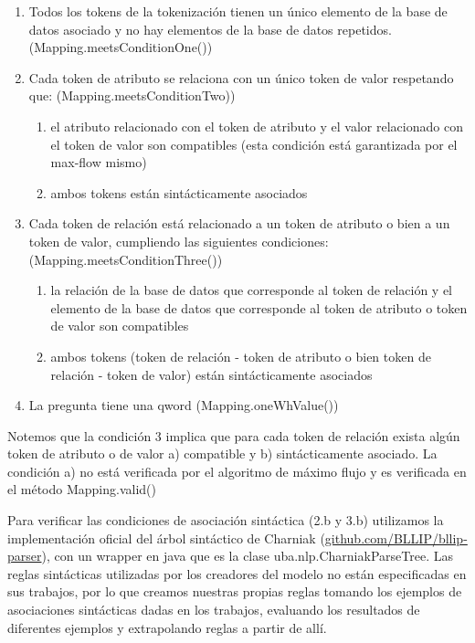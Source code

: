 \begin{enumerate}
\item Todos  los tokens de la tokenización tienen un único elemento de la base de datos asociado y no hay elementos de la base de datos repetidos. (Mapping.meetsConditionOne())
\item Cada token de atributo se relaciona con un único token de valor respetando que: (Mapping.meetsConditionTwo))
\begin{enumerate}
\item el atributo relacionado con el token de atributo y el valor relacionado con el token de valor son compatibles (esta condición está garantizada por el max-flow mismo)
\item ambos tokens están sintácticamente asociados
\end{enumerate}
\item Cada token de relación está relacionado a un token de atributo o bien a un token de valor, cumpliendo las siguientes condiciones: (Mapping.meetsConditionThree())
\begin{enumerate}
\item	la relación de la base de datos que corresponde al token de relación y el elemento de la base de datos que corresponde al token de atributo o token de valor son compatibles
\item ambos tokens (token de relación - token de atributo o bien token de relación - token de valor) están sintácticamente asociados
\end{enumerate}
\item La pregunta tiene una qword (Mapping.oneWhValue())
\end{enumerate}

Notemos que la condición 3 implica que para cada token de relación exista algún token de atributo o de valor a) compatible y b) sintácticamente asociado. La condición a) no está verificada por el algoritmo de máximo flujo y es verificada en el método Mapping.valid()

Para verificar las condiciones de asociación sintáctica (2.b y 3.b) utilizamos la implementación oficial del árbol sintáctico de Charniak (\url{github.com/BLLIP/bllip-parser}), con un wrapper en java que es la clase uba.nlp.CharniakParseTree. Las reglas sintácticas utilizadas por los creadores del modelo no están especificadas en sus trabajos, por lo que creamos nuestras propias reglas tomando los ejemplos de asociaciones sintácticas dadas en los trabajos, evaluando los resultados de diferentes ejemplos y extrapolando reglas a partir de allí.


